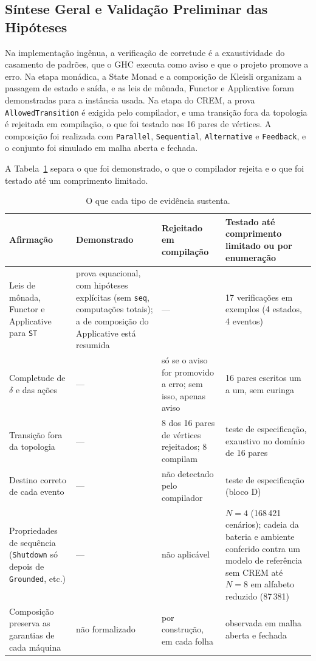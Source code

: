 \documentclass[12pt,a4paper]{article}
\begin{document}
\subsection{Síntese Geral e Validação Preliminar das Hipóteses}

Na implementação ingênua, a verificação de corretude é a exaustividade do casamento de padrões, que o GHC executa como aviso e que o projeto promove a erro. Na etapa monádica, a State Monad e a composição de Kleisli organizam a passagem de estado e saída, e as leis de mônada, Functor e Applicative foram demonstradas para a instância usada. Na etapa do CREM, a prova \texttt{AllowedTransition} é exigida pelo compilador, e uma transição fora da topologia é rejeitada em compilação, o que foi testado nos 16 pares de vértices. A composição foi realizada com \texttt{Parallel}, \texttt{Sequential}, \texttt{Alternative} e \texttt{Feedback}, e o conjunto foi simulado em malha aberta e fechada.

A Tabela~\ref{tab:evidencia} separa o que foi demonstrado, o que o compilador rejeita e o que foi testado até um comprimento limitado.

\begin{table}[h]
\centering
\footnotesize
\begin{tabular}{|p{3.0cm}|p{3.4cm}|p{3.4cm}|p{4.0cm}|}
\hline
Afirmação & Demonstrado & Rejeitado em compilação & Testado até comprimento limitado ou por enumeração \\
\hline
Leis de mônada, Functor e Applicative para \texttt{ST} & prova equacional, com hipóteses explícitas (sem \texttt{seq}, computações totais); a de composição do Applicative está resumida & --- & 17 verificações em exemplos (4 estados, 4 eventos) \\
\hline
Completude de $\delta$ e das ações & --- & só se o aviso for promovido a erro; sem isso, apenas aviso & 16 pares escritos um a um, sem curinga \\
\hline
Transição fora da topologia & --- & 8 dos 16 pares de vértices rejeitados; 8 compilam & teste de especificação, exaustivo no domínio de 16 pares \\
\hline
Destino correto de cada evento & --- & não detectado pelo compilador & teste de especificação (bloco D) \\
\hline
Propriedades de sequência (\texttt{Shutdown} só depois de \texttt{Grounded}, etc.) & --- & não aplicável & $N = 4$ (168\,421 cenários); cadeia da bateria e ambiente conferido contra um modelo de referência sem CREM até $N = 8$ em alfabeto reduzido (87\,381) \\
\hline
Composição preserva as garantias de cada máquina & não formalizado & por construção, em cada folha & observada em malha aberta e fechada \\
\hline
\end{tabular}
\caption{O que cada tipo de evidência sustenta.}
\label{tab:evidencia}
\end{table}
\end{document}
